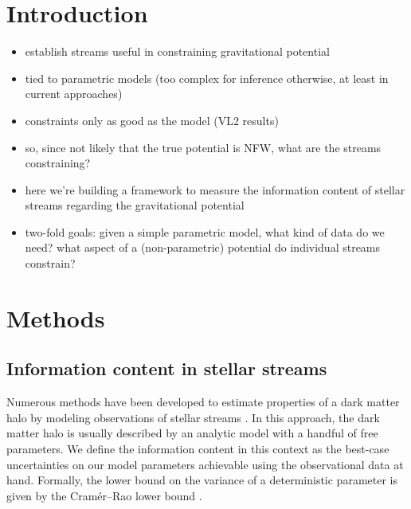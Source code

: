 \documentclass[modern]{aastex61}
\newcommand{\acronym}[1]{{\small{#1}}}
\newcommand{\CRLB}{\acronym{CRLB}}
\begin{document}

\section{Introduction} \label{sec:intro}

\begin{itemize}
 \item establish streams useful in constraining gravitational potential
 \item tied to parametric models (too complex for inference otherwise, at least in current approaches)
 \item constraints only as good as the model (VL2 results)
 \item so, since not likely that the true potential is NFW, what are the streams constraining? 
 \item here we're building a framework to measure the information content of stellar streams regarding the gravitational potential
 \item two-fold goals: given a simple parametric model, what kind of data do we need? what aspect of a (non-parametric) potential do individual streams constrain?
\end{itemize}


\section{Methods}
\label{sec:method}

\subsection{Information content in stellar streams}
Numerous methods have been developed to estimate properties of a dark matter halo by modeling observations of stellar streams \citep[e.g.,][]{}.
In this approach, the dark matter halo is usually described by an analytic model with a handful of free parameters.
We define the information content in this context as the best-case uncertainties on our model parameters achievable using the observational data at hand.
Formally, the lower bound on the variance of a deterministic parameter is given by the Cram\' er--Rao lower bound \citep[\CRLB,][]{Cramer1946, Rao1945}.
\end{document}
